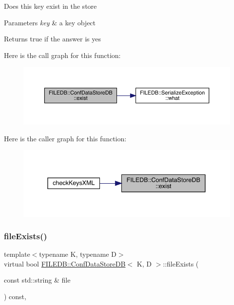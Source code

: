 Does this key exist in the store 
\begin{DoxyParams}{Parameters}
{\em key} & a key object \\
\hline
\end{DoxyParams}
\begin{DoxyReturn}{Returns}
true if the answer is yes 
\end{DoxyReturn}
Here is the call graph for this function\+:
\nopagebreak
\begin{figure}[H]
\begin{center}
\leavevmode
\includegraphics[width=350pt]{d8/d19/classFILEDB_1_1ConfDataStoreDB_afedf2b2ec0b10469cebb72397b02459d_cgraph}
\end{center}
\end{figure}
Here is the caller graph for this function\+:
\nopagebreak
\begin{figure}[H]
\begin{center}
\leavevmode
\includegraphics[width=338pt]{d8/d19/classFILEDB_1_1ConfDataStoreDB_afedf2b2ec0b10469cebb72397b02459d_icgraph}
\end{center}
\end{figure}
\mbox{\label{classFILEDB_1_1ConfDataStoreDB_aec1d15aa66421b99e7cd1151e12d2f17}} 
\subsubsection{\texorpdfstring{fileExists()}{fileExists()}\hspace{0.1cm}{\footnotesize\ttfamily [1/3]}}
{\footnotesize\ttfamily template$<$typename K, typename D$>$ \\
virtual bool \mbox{\hyperlink{classFILEDB_1_1ConfDataStoreDB}{F\+I\+L\+E\+D\+B\+::\+Conf\+Data\+Store\+DB}}$<$ K, D $>$\+::file\+Exists (\begin{DoxyParamCaption}\item[{const std\+::string \&}]{file }\end{DoxyParamCaption}) const\hspace{0.3cm}{\ttfamily [inline]}, {\ttfamily [virtual]}}

